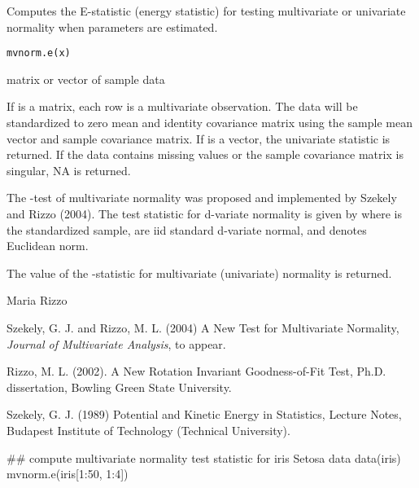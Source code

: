 \begin{Description}\relax
Computes the E-statistic (energy statistic) for testing multivariate 
or univariate normality when parameters are estimated.
\end{Description}
\begin{Usage}
\begin{verbatim}
mvnorm.e(x)
\end{verbatim}
\end{Usage}
\begin{Arguments}
\begin{ldescription}
\item[\code{x}] matrix or vector of sample data
\end{ldescription}
\end{Arguments}
\begin{Details}\relax
If  is a matrix, each row is a multivariate observation. The
data will be standardized to zero mean and identity covariance matrix
using the sample mean vector and sample covariance matrix. If 
is a vector, the univariate statistic  is returned. 
If the data contains missing values or the sample covariance matrix is 
singular, NA is returned.

The -test of multivariate normality was proposed
and implemented by Szekely and Rizzo (2004). The test statistic for 
d-variate normality is given by
where  is the standardized sample, 
 are iid standard d-variate normal, and
\eqn{\| \cdot \|}{|| ||} denotes Euclidean norm.\end{Details}
\begin{Value}
The value of the -statistic for multivariate
(univariate) normality is returned.\end{Value}
\begin{Author}\relax
Maria Rizzo 
\end{Author}
\begin{References}\relax
Szekely, G. J. and Rizzo, M. L. (2004) A New Test for 
Multivariate Normality, \emph{Journal of Multivariate Analysis},
to appear.

Rizzo, M. L. (2002). A New Rotation Invariant Goodness-of-Fit Test,
Ph.D. dissertation, Bowling Green State University.

Szekely, G. J. (1989) Potential and Kinetic Energy in Statistics, 
Lecture Notes, Budapest Institute of Technology (Technical University).\end{References}
\begin{SeeAlso}\relax
{}
\end{SeeAlso}
\begin{Examples}
\begin{ExampleCode}
 
 ## compute multivariate normality test statistic for iris Setosa data
 data(iris)
 mvnorm.e(iris[1:50, 1:4])
 \end{ExampleCode}
\end{Examples}

